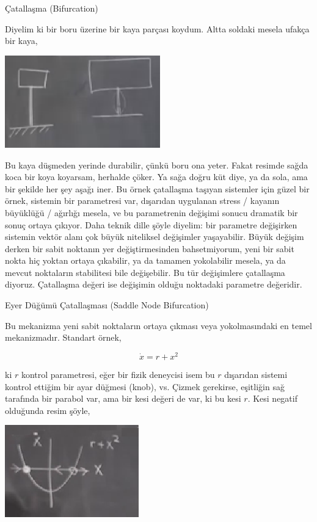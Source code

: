 \documentclass[12pt,fleqn]{article}\usepackage{../../common}
\begin{document}
Çatallaşma (Bifurcation)

Diyelim ki bir boru üzerine bir kaya parçası koydum. Altta soldaki mesela ufakça
bir kaya,

\includegraphics[height=4cm]{02_09.png}

Bu kaya düşmeden yerinde durabilir, çünkü boru ona yeter. Fakat resimde sağda
koca bir koya koyarsam, herhalde çöker. Ya sağa doğru küt diye, ya da sola, ama
bir şekilde her şey aşağı iner. Bu örnek çatallaşma taşıyan sistemler için güzel
bir örnek, sistemin bir parametresi var, dışarıdan uygulanan stress / kayanın
büyüklüğü / ağırlığı mesela, ve bu parametrenin değişimi sonucu dramatik bir
sonuç ortaya çıkıyor.  Daha teknik dille şöyle diyelim: bir parametre değişirken
sistemin vektör alanı çok büyük niteliksel değişimler yaşayabilir. Büyük değişim
derken bir sabit noktanın yer değiştirmesinden bahsetmiyorum, yeni bir sabit
nokta hiç yoktan ortaya çıkabilir, ya da tamamen yokolabilir mesela, ya da
mevcut noktaların stabilitesi bile değişebilir. Bu tür değişimlere çatallaşma
diyoruz.  Çatallaşma değeri ise değişimin olduğu noktadaki parametre değeridir.

Eyer Düğümü Çatallaşması (Saddle Node Bifurcation)

Bu mekanizma yeni sabit noktaların ortaya çıkması veya yokolmasındaki en temel
mekanizmadır. Standart örnek,

$$ \dot{x} = r + x^2 $$

ki $r$ kontrol parametresi, eğer bir fizik deneycisi isem bu $r$ dışarıdan
sistemi kontrol ettiğim bir ayar düğmesi (knob), vs. Çizmek gerekirse, eşitliğin
sağ tarafında bir parabol var, ama bir kesi değeri de var, ki bu kesi $r$. Kesi
negatif olduğunda resim şöyle, 

\includegraphics[height=4cm]{02_10.png}
\end{document}
